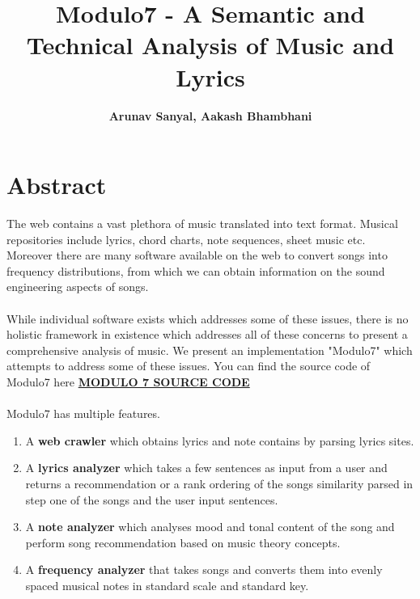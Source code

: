 \documentclass[letterpaper, 11pt]{article}
\begin{document}
\title{Modulo7 - A Semantic and Technical Analysis of Music and Lyrics
\\} 
\author{\textbf{Arunav Sanyal, Aakash Bhambhani}}
\maketitle

\section*{Abstract}
The web contains a vast plethora of music translated into text format. Musical repositories include lyrics, chord charts, note sequences, sheet music etc. Moreover there are many software available on the web to convert songs into frequency distributions, from which we can obtain information on the sound engineering aspects of songs.\\\\
While individual software exists which addresses some of these issues, there is no holistic framework in existence which addresses all of these concerns to present a comprehensive analysis of music. We present an implementation "Modulo7" which attempts to address some of these issues. You can find the source code of Modulo7 here \href{https://github.com/Khalian/Modulo7}{\textbf{MODULO 7 SOURCE CODE}}
 \\\\
Modulo7 has multiple features. 
\begin{enumerate}
\item A \textbf{web crawler} which obtains lyrics and note contains by parsing lyrics sites.
\item A \textbf{lyrics analyzer} which takes a few sentences as input from a user and returns a recommendation or a rank ordering of the songs similarity parsed in step one of the songs and the user input sentences.
\item A \textbf{note analyzer} which analyses mood and tonal content of the song and perform song recommendation based on music theory concepts.
\item A \textbf{frequency analyzer} that takes songs and converts them into evenly spaced musical notes in standard scale and standard key.
\end{enumerate} 
\end{document}
